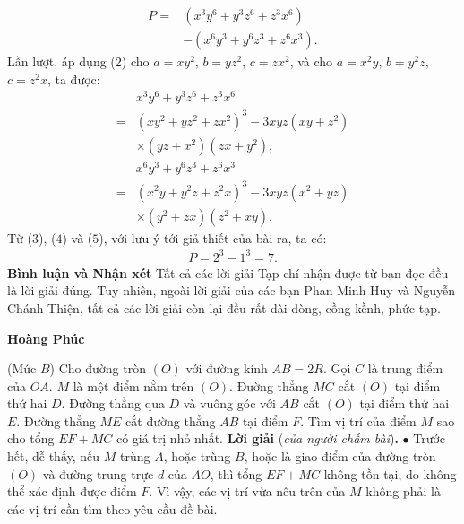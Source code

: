 \begin{multicols}{2}
\begin{align*}
		P = &\left( {{x^3}{y^6} \!+\! {y^3}{z^6} \!+\! {z^3}{x^6}} \right) \\
		&-\! \left( {{x^6}{y^3} \!+\! {y^6}{z^3} \!+\! {z^6}{x^3}} \right). \tag{$3$}
	\end{align*}
	Lần lượt, áp dụng ($2$) cho $a = xy^2$, $b = yz^2$, $c = zx^2$,   và cho $a = x^2y$, $b = y^2z$, $c = z^2x$,  ta được:
	\begin{align*}
		&{x^3}{y^6} + {y^3}{z^6} + {z^3}{x^6} \\
		= &{\left( {x{y^2} + y{z^2} + z{x^2}} \right)^3} - 3xyz\left( {xy + {z^2}} \right)\\
		&\times\left( {yz + {x^2}} \right)\left( {zx + {y^2}} \right), \tag{$4$}\\
		&{x^6}{y^3} + {y^6}{z^3} + {z^6}{x^3} \\
		= &{\left( {{x^2}y + {y^2}z + {z^2}x} \right)^3} - 3xyz\left( {{x^2} + yz} \right)\\
		&\times\left( {{y^2} + zx} \right)\left( {{z^2} + xy} \right). \tag{$5$}
	\end{align*}
	Từ ($3$), ($4$) và ($5$), với lưu ý tới giả thiết của bài ra, ta có:
	\begin{align*}
		P = {2^3} - {1^3} = 7.
	\end{align*}
	\textbf{\color{thachthuctoanhoc}Bình luận và Nhận xét}
	\vskip 0.05cm
	Tất cả các lời giải Tạp chí nhận được từ bạn đọc đều là lời giải đúng. Tuy nhiên, ngoài lời giải của các bạn Phan Minh Huy và Nguyễn Chánh Thiện, tất cả các lời giải còn lại đều rất dài dòng, cồng kềnh, phức tạp.
	\begin{flushright}
		\textbf{\color{thachthuctoanhoc}Hoàng Phúc}
	\end{flushright}
	{}
	(Mức $B$) Cho đường tròn $(O)$ với đường kính $AB = 2R$. Gọi $C$ là trung điểm của $OA$. $M$ là một điểm nằm trên $(O)$. Đường thẳng $MC$ cắt $(O)$ tại điểm thứ hai $D$. Đường thẳng qua $D$ và vuông góc với $AB$ cắt $(O)$ tại điểm thứ hai $E$. Đường thẳng $ME$ cắt đường thẳng $AB$ tại điểm $F$. Tìm vị trí của điểm $M$ sao cho tổng $EF + MC$ có giá trị nhỏ nhất.
	\vskip 0.05cm
	\textbf{\color{thachthuctoanhoc}Lời giải} (\textit{của người chấm bài})\textbf{\color{thachthuctoanhoc}.}
	\vskip 0.05cm
	$\bullet$ Trước hết, dễ thấy, nếu $M$ trùng $A$, hoặc trùng $B$, hoặc là giao điểm của đường tròn $(O)$ và đường trung trực $d$ của $AO$, thì tổng $EF + MC$ không tồn tại, do không thể xác định được điểm $F$. Vì vậy, các vị trí vừa nêu trên của $M$ không phải là các vị trí cần tìm theo yêu cầu đề bài.

\end{multicols}
